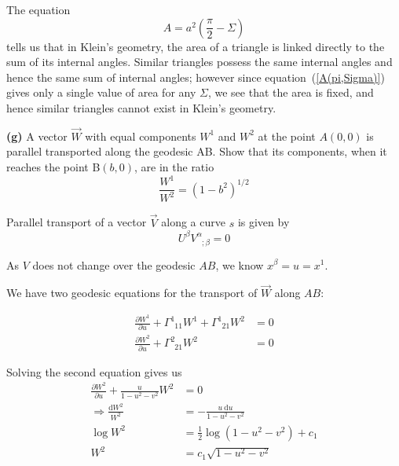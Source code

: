\documentclass[a4paper]{article} %
\newcommand{\ph}[1]{\phantom{#1}}
\begin{document}
The equation
\begin{equation*}
A=a^2\left(\frac{\pi}{2}-\Sigma\right)
\end{equation*}
tells us that in Klein's geometry, the area of a triangle is linked directly to the sum of its internal angles. Similar triangles possess the same internal angles and hence the same sum of internal angles; however since equation~(\ref{A(pi,Sigma)}) gives only a single value of area for any $\Sigma$, we see that the area is fixed, and hence similar triangles cannot exist in Klein's geometry.

\pagebreak  %

\begin{framed}
\textbf{(g)} A vector $\vec{W}$ with equal components $W^1$ and $W^2$ at the point $A(0,0)$ is parallel transported along the geodesic AB. Show that its components, when it reaches the point B$(b,0)$, are in the ratio
\begin{equation}
\frac{W^1}{W^2}=(1-b^2)^{1/2}
\end{equation}
\end{framed}

Parallel transport of a vector $\vec{V}$ along a curve $s$ is given by
\begin{equation}
U^{\beta}V^{\alpha}_{\ph{\alpha};\beta}=0
\end{equation}

As $V$ does not change over the geodesic $AB$, we know $x^{\beta}=u=x^{1}$.

We have two geodesic equations for the transport of $\vec{W}$ along $AB$:

\begin{align}
\frac{\partial W^{1}}{\partial u}+\Gamma^{1}_{\ph{1}11}W^{1}
+\Gamma^{1}_{\ph{1}21}W^2&=0 \label{W1 diff eqn}\\
\frac{\partial W^{2}}{\partial u}+\Gamma^{2}_{\ph{2}21}W^2&=0
\end{align}

Solving the second equation gives us
\begin{align}
\frac{\partial W^2}{\partial u}+\frac{u}{1-u^2-v^2}W^2&=0\\
\Rightarrow \frac{\text{d}W^2}{W^2}&=-\frac{u~\text{d}u}{1-u^2-v^2}\\
\log W^2&=\frac{1}{2}\log(1-u^2-v^2)+c_{1}\\
W^2&=c_1\sqrt{1-u^2-v^2}\label{W2 eqn}
\end{align}
\end{document}
